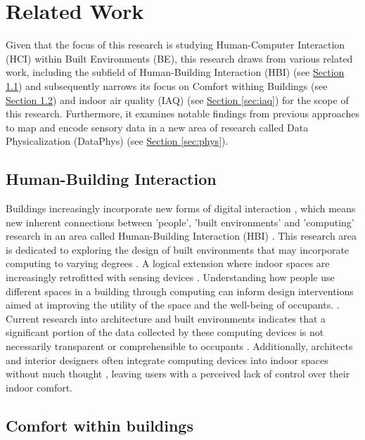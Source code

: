 \section{Related Work}
\label{sec:related_work}
Given that the focus of this research is studying Human-Computer Interaction (HCI) within Built Environments (BE), this research draws from various related work, including the subfield of Human-Building Interaction (HBI) (see \hyperref[sec:hbi]{Section \ref*{sec:hbi}}) and subsequently narrows its focus on Comfort withing Buildings (see \hyperref[sec:poe]{Section \ref*{sec:poe}}) and indoor air quality (IAQ) (see \hyperref[sec:iaq]{Section \ref*{sec:iaq}}) for the scope of this research. Furthermore, it examines notable findings from previous approaches to map and encode sensory data in a new area of research called Data Physicalization (DataPhys) (see \hyperref[sec:phys]{Section \ref*{sec:phys}}).

\subsection{Human-Building Interaction}
\label{sec:hbi}

Buildings increasingly incorporate new forms of digital interaction \cite{pulsipher_towards_2023, margariti_understanding_2023}, which means new inherent connections between 'people', 'built environments' and 'computing' research in an area called Human-Building Interaction (HBI) \cite{alavi_introduction_2019, taherkhani_human-building_2023}. This research area is dedicated to exploring the design of built environments that may incorporate computing to varying degrees \cite{sowles_introducing_2021}. A logical extension where indoor spaces are increasingly retrofitted with sensing devices \cite{pulsipher_towards_2023}. Understanding how people use different spaces in a building through computing can inform design interventions aimed at improving the utility of the space and the well-being of occupants. \cite{verma_studying_2017}. Current research into architecture and built environments indicates that a significant portion of the data collected by these computing devices is not necessarily transparent or comprehensible to occupants \cite{schnadelbach_adaptive_2019}. Additionally, architects and interior designers often integrate computing devices into indoor spaces without much thought  \cite{johansen_temporal_2019, kirsh_architects_2019}, leaving users with a perceived lack of control over their indoor comfort. 

\subsection{Comfort within buildings}
\label{sec:poe}

